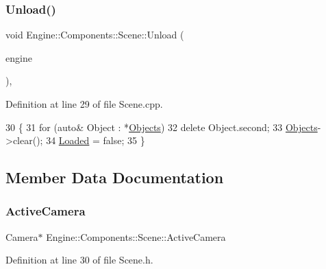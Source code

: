 \subsubsection{\texorpdfstring{Unload()}{Unload()}}
{\footnotesize\ttfamily void Engine\+::\+Components\+::\+Scene\+::\+Unload (\begin{DoxyParamCaption}\item[{\mbox{\hyperlink{classEngine_1_1BaseEngine}{Base\+Engine}} $\ast$}]{engine }\end{DoxyParamCaption})\hspace{0.3cm}{\ttfamily [virtual]}, {\ttfamily [inherited]}}



Definition at line 29 of file Scene.\+cpp.


\begin{DoxyCode}
30 \{
31     \textcolor{keywordflow}{for} (\textcolor{keyword}{auto}& Object : *\mbox{\hyperlink{classEngine_1_1Components_1_1Scene_a23481feabaaa56bf5613765db03af4da}{Objects}})
32         \textcolor{keyword}{delete} Object.second;
33     \mbox{\hyperlink{classEngine_1_1Components_1_1Scene_a23481feabaaa56bf5613765db03af4da}{Objects}}->clear();
34     \mbox{\hyperlink{classEngine_1_1Components_1_1Scene_ae828757eea5410550f6674421051a783}{Loaded}} = \textcolor{keyword}{false};
35 \}
\end{DoxyCode}


\subsection{Member Data Documentation}
\mbox{\label{classEngine_1_1Components_1_1Scene_a9408befee37d89e2c001d25b9e4ed75a}} 
\subsubsection{\texorpdfstring{Active\+Camera}{ActiveCamera}}
{\footnotesize\ttfamily Camera$\ast$ Engine\+::\+Components\+::\+Scene\+::\+Active\+Camera\hspace{0.3cm}{\ttfamily [inherited]}}



Definition at line 30 of file Scene.\+h.




